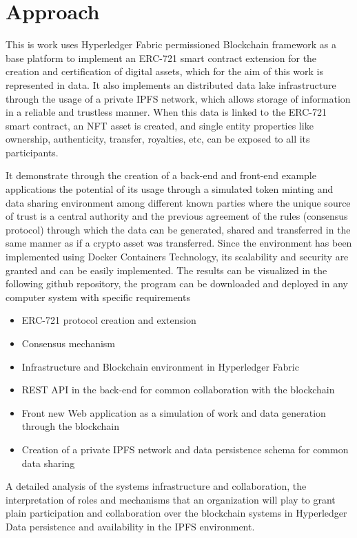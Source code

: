 \documentclass[a4paper]{article}
\begin{document}
\section{Approach}
This is work uses Hyperledger Fabric permissioned Blockchain framework as a base platform to implement an ERC-721 smart contract extension for the creation and certification of digital assets, which for the aim of this work is represented in data. 
It also implements an distributed data lake infrastructure through the usage of a private IPFS network, which allows storage of information in a reliable and trustless manner. When this data is linked to the ERC-721 smart contract, an NFT asset is created, and single entity properties like ownership, authenticity, transfer, royalties, etc, can be exposed to all its participants.

It demonstrate through the creation of a back-end and front-end example applications the potential of its usage through a simulated token minting and data sharing environment among different known parties where the unique source of trust is a central authority and the previous agreement of the rules (consensus protocol) through which the data can be generated, shared and transferred in the same manner as if a crypto asset was transferred. Since the environment has been implemented using Docker Containers Technology, its scalability and security are granted and can be easily implemented.  The results can be visualized in  the following github repository, the program can be downloaded and deployed in any computer system with specific requirements
\begin{itemize}
    \item ERC-721 protocol creation and extension
    \item Consensus mechanism
    \item Infrastructure and Blockchain environment in Hyperledger Fabric
    \item REST API in the back-end for common collaboration with the blockchain
    \item Front new Web application as a simulation of  work and data generation through the blockchain
    \item Creation of a private IPFS network and data persistence schema for common data sharing
\end{itemize}

A detailed analysis of the systems infrastructure and collaboration, the interpretation of roles and mechanisms that an organization will play to grant plain participation and collaboration over the blockchain systems in Hyperledger
Data persistence and availability in the IPFS environment.
\end{document}
